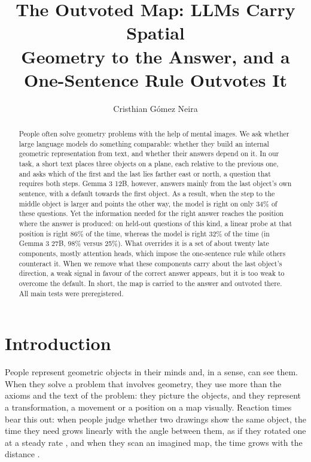 \documentclass{article}
\title{The Outvoted Map: LLMs Carry Spatial\\ Geometry to the Answer, and a\\ One-Sentence Rule Outvotes It}
\author{Cristhian G\'omez Neira}
\begin{document}
\maketitle

\begin{abstract}
People often solve geometry problems with the help of mental images. We ask whether large language models do
something comparable: whether they build an internal geometric representation from text, and whether their answers
depend on it. In our task, a short text places three objects on a plane, each relative to the previous one, and asks
which of the first and the last lies farther east or north, a question that requires both steps. Gemma 3 12B, however, answers mainly from the last object's own sentence, with a default towards the first object. As a result, when the step to the
middle object is larger and points the other way, the model is right on only 34\% of these questions. Yet the
information needed for the right answer reaches the position where the answer is produced: on held-out questions of
this kind, a linear probe at that position is right 86\% of the time, whereas the model is right 32\% of the time (in
Gemma 3 27B, 98\% versus 25\%). What overrides it is a set of about twenty late components, mostly attention heads, which impose the one-sentence rule while others counteract it. When we remove what these components carry about the last object's direction, a weak
signal in favour of the correct answer appears, but it is too weak to overcome the default. In short, the map is carried to the answer and outvoted there. All main tests were preregistered.
\end{abstract}

\section{Introduction}
People represent geometric objects in their minds and, in a sense, can see them. When they solve a problem that
involves geometry, they use more than the axioms and the text of the problem: they picture the objects, and they
represent a transformation, a movement or a position on a map visually. Reaction times bear this out: when people judge whether two drawings show the same object, the time they need grows linearly with the angle between them, as if
they rotated one at a steady rate \citep{shepard1971rotation}, and when they scan an imagined map, the time grows with
the distance \citep{kosslyn1978scanning}.
\end{document}
